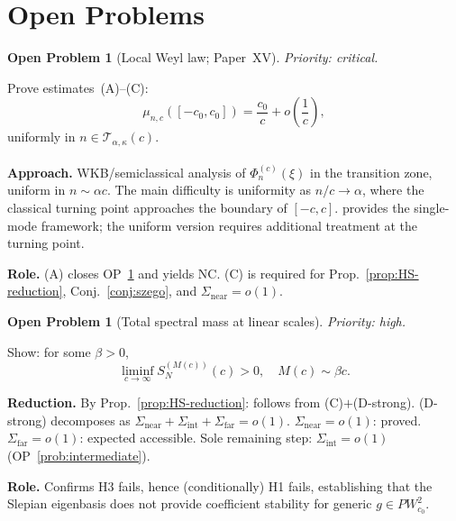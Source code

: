 \documentclass[12pt,a4paper]{amsart}
\theoremstyle{definition}
\newtheorem{problem}[theorem]{Open Problem}
\theoremstyle{remark}
\newcommand{\PW}{PW}
\begin{document}
\section{Open Problems}
\label{sec:open}

\begin{problem}[Local Weyl law;
  Paper~XV]
\label{prob:fourier-mass}
\emph{Priority: critical.}

Prove estimates~(A)--(C):
\[
  \mu_{n,c}([-c_0,c_0])
  = \frac{c_0}{c}
  + o\!\left(\frac{1}{c}\right),
\]
uniformly in
$n\in\mathcal{T}_{\alpha,\kappa}(c)$.

\medskip\noindent
\textbf{Approach.}
WKB/semiclassical analysis of
$\widehat{\Phi_n^{(c)}}(\xi)$
in the transition zone, uniform
in $n\sim\alpha c$.
The main difficulty is uniformity
as $n/c\to\alpha$, where the
classical turning point approaches
the boundary of $[-c,c]$.
\cite{Osipov2013} provides the
single-mode framework;
the uniform version requires
additional treatment at the
turning point.

\medskip\noindent
\textbf{Role.}
(A) closes OP~\ref{prob:fourier-mass}
and yields NC.
(C) is required for
Prop.~\ref{prop:HS-reduction},
Conj.~\ref{conj:szego}, and
$\Sigma_{\mathrm{near}}=o(1)$.
\end{problem}

\begin{problem}[Total spectral mass
  at linear scales]
\label{prob:H1H3}
\emph{Priority: high.}

Show: for some $\beta>0$,
\[
  \liminf_{c\to\infty}
  S_N^{(M(c))}(c) > 0,
  \quad M(c)\sim\beta c.
\]

\medskip\noindent
\textbf{Reduction.}
By Prop.~\ref{prop:HS-reduction}:
follows from (C)$+$(D-strong).
(D-strong) decomposes as
$\Sigma_{\mathrm{near}}
+\Sigma_{\mathrm{int}}
+\Sigma_{\mathrm{far}}=o(1)$.
$\Sigma_{\mathrm{near}}=o(1)$:
proved.
$\Sigma_{\mathrm{far}}=o(1)$:
expected accessible.
Sole remaining step:
$\Sigma_{\mathrm{int}}=o(1)$
(OP~\ref{prob:intermediate}).

\medskip\noindent
\textbf{Role.}
Confirms H3 fails, hence
(conditionally) H1 fails,
establishing that the Slepian
eigenbasis does not provide
coefficient stability for generic
$g\in\PW_{c_0}^2$.
\end{problem}
\end{document}
